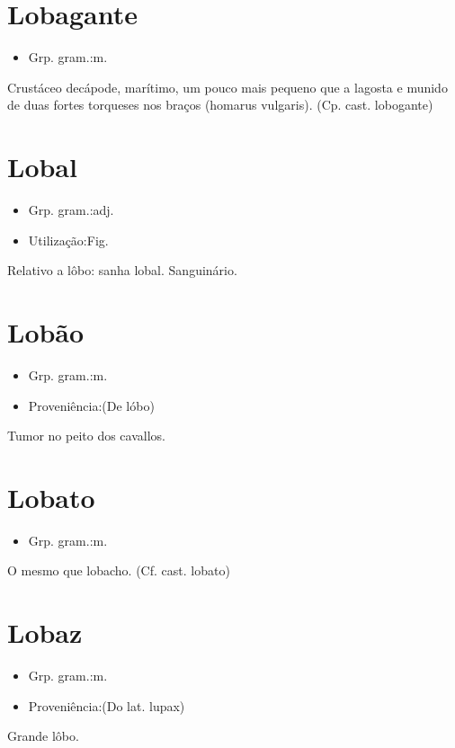 \section{Lobagante}
\begin{itemize}
\item {Grp. gram.:m.}
\end{itemize}
Crustáceo decápode, marítimo, um pouco mais pequeno que a lagosta e munido de duas fortes torqueses nos braços (\textunderscore homarus vulgaris\textunderscore ).
(Cp. cast. \textunderscore lobogante\textunderscore )
\section{Lobal}
\begin{itemize}
\item {Grp. gram.:adj.}
\end{itemize}
\begin{itemize}
\item {Utilização:Fig.}
\end{itemize}
Relativo a lôbo: \textunderscore sanha lobal\textunderscore .
Sanguinário.
\section{Lobão}
\begin{itemize}
\item {Grp. gram.:m.}
\end{itemize}
\begin{itemize}
\item {Proveniência:(De \textunderscore lóbo\textunderscore )}
\end{itemize}
Tumor no peito dos cavallos.
\section{Lobato}
\begin{itemize}
\item {Grp. gram.:m.}
\end{itemize}
O mesmo que \textunderscore lobacho\textunderscore .
(Cf. cast. \textunderscore lobato\textunderscore )
\section{Lobaz}
\begin{itemize}
\item {Grp. gram.:m.}
\end{itemize}
\begin{itemize}
\item {Proveniência:(Do lat. \textunderscore lupax\textunderscore )}
\end{itemize}
Grande lôbo.
